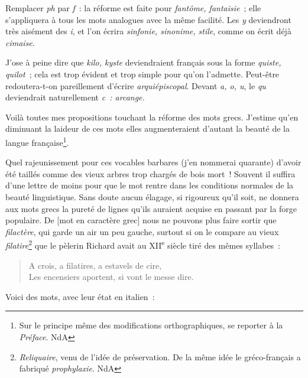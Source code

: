 \documentclass[french,twoside]{book} %
\begin{document}
Remplacer {\itshape ph} par {\itshape f} : la réforme est faite pour {\itshape fantôme, fantaisie} ; elle s’appliquera à tous les mots analogues avec la même facilité. Les {\itshape y} deviendront très aisément des {\itshape i}, et l’on écrira {\itshape sinfonie, sinonime, stile}, comme on écrit déjà {\itshape cimaise}.\par
J’ose à peine dire que {\itshape kilo, kyste} deviendraient français sous la forme {\itshape quiste, quilot} ; cela est trop évident et trop simple pour qu’on l’admette. Peut-être redoutera-t-on pareillement d’écrire {\itshape arquiépiscopal}. Devant {\itshape a, o, u}, le {\itshape qu} deviendrait naturellement {\itshape c : arcange.}\par
Voilà toutes mes propositions touchant la réforme des mots grecs. J’estime qu’en diminuant la laideur de ces mots elles augmenteraient d’autant la beauté de la langue française\footnote{Sur le principe même des modifications orthographiques, se reporter à la {\itshape Préface}. NdA}.\par
Quel rajeunissement pour ces vocables barbares (j’en nommerai quarante) d’avoir été taillés comme des vieux arbres trop chargés de bois mort ! Souvent il suffira d’une lettre de moins pour que le mot rentre dans les conditions normales de la beauté linguistique. Sans doute aucun élagage, si rigoureux qu’il soit, ne donnera aux mots grecs la pureté de lignes qu’ils auraient acquise en passant par la forge populaire. De [mot en caractère grec] nous ne pouvons plus faire sortir que {\itshape filactère}, qui garde un air un peu gauche, surtout si on le compare au vieux {\itshape filatire}\footnote{{\itshape Reliquaire}, venu de l’idée de préservation. De la même idée le gréco-français a fabriqué {\itshape prophylaxie}. NdA} que le pèlerin Richard avait au XII\textsuperscript{e} siècle tiré des mêmes syllabes :\par


\begin{verse}
A crois, a filatires, a estavels de cire,\\
Les encensiers aportent, si vont le messe dire.\\
\end{verse}

\noindent Voici des mots, avec leur état en italien :\par
\end{document}
